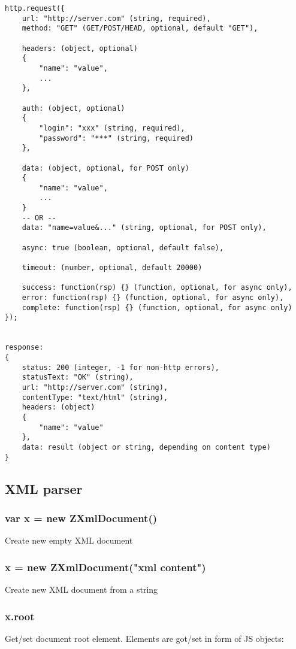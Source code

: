 \begin{lstlisting}
http.request({
	url: "http://server.com" (string, required),
	method: "GET" (GET/POST/HEAD, optional, default "GET"),
	
	headers: (object, optional)
	{
		"name": "value",
		...
	},
	
	auth: (object, optional)
	{
		"login": "xxx" (string, required),
		"password": "***" (string, required)
	},
	
	data: (object, optional, for POST only)
	{
		"name": "value",
		...
	}
	-- OR --
	data: "name=value&..." (string, optional, for POST only),

	async: true (boolean, optional, default false),

	timeout: (number, optional, default 20000)
	
	success: function(rsp) {} (function, optional, for async only),
	error: function(rsp) {} (function, optional, for async only),
	complete: function(rsp) {} (function, optional, for async only)
});


response:
{
	status: 200 (integer, -1 for non-http errors),
	statusText: "OK" (string),
	url: "http://server.com" (string),
	contentType: "text/html" (string),
	headers: (object)
	{
		"name": "value"
	},
	data: result (object or string, depending on content type)
}
\end{lstlisting}

\subsection{XML parser}


\subsubsection{var x = new ZXmlDocument()}
Create new empty XML document

\subsubsection{x = new ZXmlDocument("xml content")}
Create new XML document from a string

\subsubsection{x.root}
Get/set document root element. Elements are got/set in form of JS objects:

